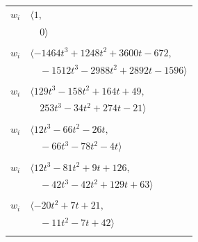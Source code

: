 \documentclass[11pt]{article}
\begin{document}
\begin{longtable}{@{}ll@{}}
$w_i$ & $\langle 1,$\\
 & $\quad 0\rangle$\\
\addlinespace[2pt]
\multicolumn{2}{@{}p{0.97\textwidth}@{}}{$i=67$, $D_i=1$, $\rho_{ij}$: $1{:}2, \allowbreak 3{:}2, \allowbreak 5{:}1, \allowbreak 17{:}2, \allowbreak 27{:}1, \allowbreak 37{:}2, \allowbreak 61{:}2, \allowbreak 65{:}2, \allowbreak 69{:}2, \allowbreak 75{:}1, \allowbreak 81{:}2, \allowbreak 82{:}2, \allowbreak 84{:}2$}\\
$w_i$ & $\langle -1464t^{3}+1248t^{2}+3600t-672,$\\
 & $\quad -1512t^{3}-2988t^{2}+2892t-1596\rangle$\\
\addlinespace[2pt]
\multicolumn{2}{@{}p{0.97\textwidth}@{}}{$i=68$, $D_i=1$, $\rho_{ij}$: $17{:}1, \allowbreak 18{:}2, \allowbreak 19{:}2, \allowbreak 26{:}2, \allowbreak 33{:}1, \allowbreak 36{:}1, \allowbreak 37{:}1, \allowbreak 39{:}2, \allowbreak 55{:}1, \allowbreak 60{:}1, \allowbreak 61{:}1, \allowbreak 78{:}2, \allowbreak 89{:}2$}\\
$w_i$ & $\langle 129t^{3}-158t^{2}+164t+49,$\\
 & $\quad 253t^{3}-34t^{2}+274t-21\rangle$\\
\addlinespace[2pt]
\multicolumn{2}{@{}p{0.97\textwidth}@{}}{$i=69$, $D_i=1$, $\rho_{ij}$: $5{:}1, \allowbreak 60{:}2, \allowbreak 67{:}1, \allowbreak 71{:}2, \allowbreak 77{:}2, \allowbreak 97{:}1$}\\
$w_i$ & $\langle 12t^{3}-66t^{2}-26t,$\\
 & $\quad -66t^{3}-78t^{2}-4t\rangle$\\
\addlinespace[2pt]
\multicolumn{2}{@{}p{0.97\textwidth}@{}}{$i=70$, $D_i=1$, $\rho_{ij}$: $2{:}1, \allowbreak 18{:}1, \allowbreak 39{:}2, \allowbreak 56{:}2, \allowbreak 61{:}1, \allowbreak 71{:}1, \allowbreak 74{:}2, \allowbreak 77{:}2, \allowbreak 84{:}2, \allowbreak 86{:}2$}\\
$w_i$ & $\langle 12t^{3}-81t^{2}+9t+126,$\\
 & $\quad -42t^{3}-42t^{2}+129t+63\rangle$\\
\addlinespace[2pt]
\multicolumn{2}{@{}p{0.97\textwidth}@{}}{$i=71$, $D_i=1$, $\rho_{ij}$: $16{:}1, \allowbreak 33{:}2, \allowbreak 39{:}1, \allowbreak 55{:}1, \allowbreak 61{:}2, \allowbreak 65{:}2, \allowbreak 69{:}1, \allowbreak 70{:}2, \allowbreak 96{:}1$}\\
$w_i$ & $\langle -20t^{2}+7t+21,$\\
 & $\quad -11t^{2}-7t+42\rangle$\\
\addlinespace[2pt]

\end{longtable}
\end{document}
